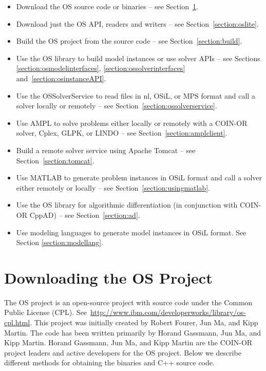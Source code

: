 \documentclass[11pt]{article}
\renewcommand{\_}{{\char"5F}}
\renewcommand{\{}{{\char"7B}}
\renewcommand{\}}{{\char"7D}}
\renewcommand{\^}{{\char"0D}}
\renewcommand{\'}{{\char"0D}}
\newif\ifknitro \knitrofalse    %
\begin{document}
\begin{itemize}
\item Download the OS source code or binaries -- see Section~\ref{section:download}.

\item Download just the OS API, readers and writers -- see Section~\ref{section:oslite}.

\item Build the OS project from the source code -- see Section~\ref{section:build}.

\item Use the OS library to build model instances or use solver APIs -- see Sections \ref{section:osmodelinterfaces},  
\ref{section:ossolverinterfaces} and~\ref{section:osinstanceAPI}.

\item Use the OSSolverService to read files in nl, OSiL, or MPS format and call a solver locally or remotely -- see 
Section~\ref{section:ossolverservice}.


\item Use AMPL to solve problems either locally or remotely with a COIN-OR solver, Cplex, GLPK, \ifknitro Knitro, \fi 
or LINDO -- see Section~\ref{section:amplclient}.


\item Build a remote solver service using Apache Tomcat -- see Section~\ref{section:tomcat}.

\item Use MATLAB to generate problem instances in OSiL format and call a solver either remotely or locally -- see 
Section~\ref{section:usingmatlab}.

\item Use the OS library for algorithmic differentiation (in conjunction with COIN-OR CppAD) -- see 
Section~\ref{section:ad}.

\item Use modeling languages to generate model instances in OSiL format. See Section \ref{section:modellang}.
\end{itemize}


\section{Downloading the OS Project}\label{section:download}

The OS project is an open-source project  with source code under the Common Public License (CPL). 
See~\url{http://www.ibm.com/developerworks/library/os-cpl.html}.
This project was initially created by Robert Fourer, Jun Ma, and Kipp Martin. 
The code has been written primarily by  Horand Gassmann,   Jun Ma,  and Kipp Martin.    Horand Gassmann,  Jun Ma,  and Kipp Martin are the COIN-OR project leaders and active developers for the OS project.    
Below we describe different methods for obtaining the binaries and C++ source code.
\end{document}
